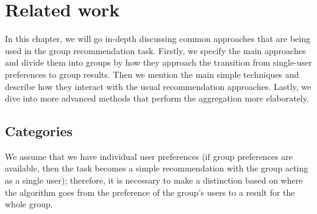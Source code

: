 \chapter{Related work} \label{chap:related_work}

In this chapter, we will go in-depth discussing common approaches that are being used in the group recommendation task. Firstly, we specify the main approaches and divide them into groups by how they approach the transition from single-user preferences to group results.
Then we mention the main simple techniques and describe how they interact with the usual recommendation approaches. Lastly, we dive into more advanced methods that perform the aggregation more elaborately.

\section{Categories} \label{sec:03_categories}
We assume that we have individual user preferences (if group preferences are available, then the task becomes a simple recommendation with the group acting as a single user); therefore, it is necessary to make a distinction based on where the algorithm goes from the preference of the group's users to a result for the whole group.

